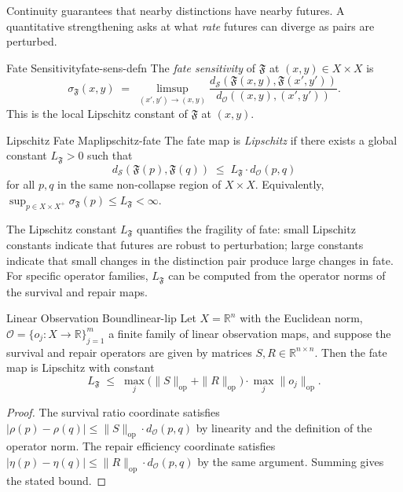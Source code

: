 \documentclass[12pt,twoside,openright]{book}
\newcommand{\distPairs}{X\times X}
\newcommand{\obs}{\mathcal{O}}
\newcommand{\fateMap}{\mathfrak{F}}
\newcommand{\fateSpace}{\mathcal{S}}
\newcommand{\survRatio}{\rho}             %
\newcommand{\repEff}{\eta}               %
\newcommand{\fateDist}[2]{d_{\fateSpace}(#1,#2)}
\newcommand{\distDist}[2]{d_{\mathcal{O}}(#1,#2)}
\newcommand{\fateSens}[1]{\sigma_{\fateMap}(#1)}
\newcommand{\fateLip}{L_{\fateMap}}
\providecommand{\fateDist}[2]{d_{\fateSpace}(#1,#2)}
\providecommand{\distDist}[2]{d_{\mathcal{O}}(#1,#2)}
\providecommand{\fateSens}[1]{\sigma_{\fateMap}(#1)}
\providecommand{\fateLip}{L_{\fateMap}}
\begin{document}
Continuity guarantees that nearby distinctions have nearby futures.
A quantitative strengthening asks at what \emph{rate} futures can
diverge as pairs are perturbed.

\begin{definition}{Fate Sensitivity}{fate-sens-defn}
The \emph{fate sensitivity} of $\fateMap$ at $(x,y)\in\distPairs$
is
\[
  \fateSens{x,y}
  \;=\;
  \limsup_{(x',y')\to(x,y)}
  \frac{
    \fateDist{\fateMap(x,y)}{\fateMap(x',y')}
  }{
    \distDist{(x,y)}{(x',y')}
  }.
\]
This is the local Lipschitz constant of $\fateMap$ at $(x,y)$.
\end{definition}

\begin{definition}{Lipschitz Fate Map}{lipschitz-fate}
The fate map is \emph{Lipschitz} if there exists a global constant
$\fateLip>0$ such that
\[
  \fateDist{\fateMap(p)}{\fateMap(q)}
  \;\le\;
  \fateLip\cdot\distDist{p}{q}
\]
for all $p,q$ in the same non-collapse region of $\distPairs$.
Equivalently, $\sup_{p\in\distPairs^+}\fateSens{p}\le\fateLip<\infty$.
\end{definition}

The Lipschitz constant $\fateLip$ quantifies the fragility of
fate: small Lipschitz constants indicate that futures are robust
to perturbation; large constants indicate that small changes in
the distinction pair produce large changes in fate. For specific
operator families, $\fateLip$ can be computed from the operator
norms of the survival and repair maps.

\begin{proposition}{Linear Observation Bound}{linear-lip}
Let $X=\mathbb{R}^n$ with the Euclidean norm,
$\obs=\{o_j:X\to\mathbb{R}\}_{j=1}^m$ a finite family of
linear observation maps, and suppose the survival and repair
operators are given by matrices $S,R\in\mathbb{R}^{n\times n}$.
Then the fate map is Lipschitz with constant
\[
  \fateLip
  \;\le\;
  \max_{j}\bigl(\|S\|_{\mathrm{op}}+\|R\|_{\mathrm{op}}\bigr)
  \cdot
  \max_{j}\|o_j\|_{\mathrm{op}}.
\]
\begin{proof}
The survival ratio coordinate satisfies
$|\survRatio(p)-\survRatio(q)|
\le\|S\|_{\mathrm{op}}\cdot\distDist{p}{q}$
by linearity and the definition of the operator norm.
The repair efficiency coordinate satisfies
$|\repEff(p)-\repEff(q)|
\le\|R\|_{\mathrm{op}}\cdot\distDist{p}{q}$
by the same argument.
Summing gives the stated bound.
\end{proof}
\end{proposition}
\end{document}
